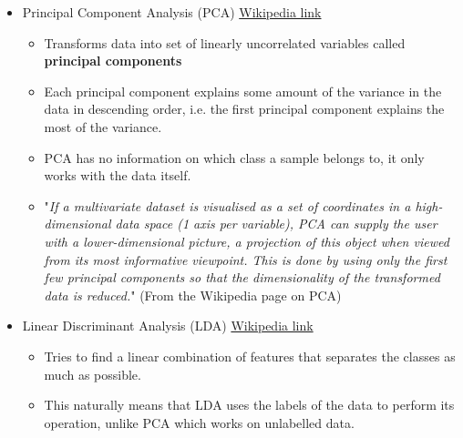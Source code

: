 \documentclass[11pt]{article}
\providecommand{\tightlist}{%
      \setlength{\itemsep}{0pt}\setlength{\parskip}{0pt}}
\begin{document}
\begin{itemize}
\tightlist
\item
  Principal Component Analysis (PCA)
  \href{https://en.wikipedia.org/wiki/Principal_component_analysis}{Wikipedia
  link}

  \begin{itemize}
  \tightlist
  \item
    Transforms data into set of linearly uncorrelated variables called
    \textbf{principal components}
  \item
    Each principal component explains some amount of the variance in the
    data in descending order, i.e. the first principal component
    explains the most of the variance.
  \item
    PCA has no information on which class a sample belongs to, it only
    works with the data itself.
  \item
    "\emph{If a multivariate dataset is visualised as a set of
    coordinates in a high-dimensional data space (1 axis per variable),
    PCA can supply the user with a lower-dimensional picture, a
    projection of this object when viewed from its most informative
    viewpoint. This is done by using only the first few principal
    components so that the dimensionality of the transformed data is
    reduced.}" (From the Wikipedia page on PCA)
  \end{itemize}
\item
  Linear Discriminant Analysis (LDA)
  \href{https://en.wikipedia.org/wiki/Linear_discriminant_analysis}{Wikipedia
  link}

  \begin{itemize}
  \tightlist
  \item
    Tries to find a linear combination of features that separates the
    classes as much as possible.
  \item
    This naturally means that LDA uses the labels of the data to perform
    its operation, unlike PCA which works on unlabelled data.
  \end{itemize}
\end{itemize}
\end{document}
